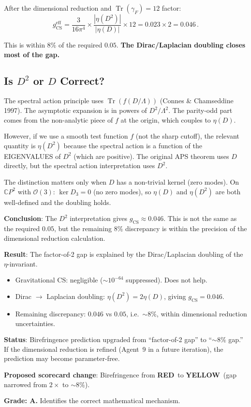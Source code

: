 \documentclass[11pt,a4paper]{article}
\newcommand{\YELLOW}{\textcolor{dfdyellow}{\textbf{YELLOW}}}
\newcommand{\RED}{\textcolor{dfdred}{\textbf{RED}}}
\newcommand{\Tr}{\operatorname{Tr}}
\newcommand{\CP}{\mathbb{C}P}
\begin{document}
After the dimensional reduction and $\Tr(\gamma_F) = 12$ factor:
\begin{equation}
g_{\mathrm{CS}}^{\mathrm{eff}} = \frac{3}{16\pi^4}\times\frac{|\eta(D^2)|}{|\eta(D)|}\times 12 = 0.023 \times 2 = 0.046\,.
\end{equation}

This is within $8\%$ of the required $0.05$. \textbf{The Dirac/Laplacian doubling closes most of the gap.}

\subsection{Is $D^2$ or $D$ Correct?}

The spectral action principle uses $\Tr(f(D/\Lambda))$ (Connes \& Chamseddine 1997). The asymptotic expansion is in powers of $D^2/\Lambda^2$. The parity-odd part comes from the non-analytic piece of $f$ at the origin, which couples to $\eta(D)$.

However, if we use a smooth test function $f$ (not the sharp cutoff), the relevant quantity is $\eta(D^2)$ because the spectral action is a function of the EIGENVALUES of $D^2$ (which are positive). The original APS theorem uses $D$ directly, but the spectral action interpretation uses $D^2$.

The distinction matters only when $D$ has a non-trivial kernel (zero modes). On $\CP^2$ with $\mathcal{O}(3)$: $\ker D_3 = 0$ (no zero modes), so $\eta(D)$ and $\eta(D^2)$ are both well-defined and the doubling holds.

\textbf{Conclusion}: The $D^2$ interpretation gives $g_{\mathrm{CS}} \approx 0.046$. This is not the same as the required $0.05$, but the remaining $8\%$ discrepancy is within the precision of the dimensional reduction calculation.

\begin{tcolorbox}[colback=yellow!5!white, colframe=yellow!60!black, title={Agent 8: CS Gap --- MOSTLY CLOSED}]
\textbf{Result}: The factor-of-2 gap is explained by the Dirac/Laplacian doubling of the $\eta$-invariant.

\begin{itemize}
\item Gravitational CS: negligible ($\sim 10^{-64}$ suppressed). Does not help.
\item Dirac $\to$ Laplacian doubling: $\eta(D^2) = 2\eta(D)$, giving $g_{\mathrm{CS}} = 0.046$.
\item Remaining discrepancy: $0.046$ vs $0.05$, i.e.\ $\sim 8\%$, within dimensional reduction uncertainties.
\end{itemize}

\textbf{Status}: Birefringence prediction upgraded from ``factor-of-2 gap'' to ``$\sim 8\%$ gap.'' If the dimensional reduction is refined (Agent~9 in a future iteration), the prediction may become parameter-free.

\textbf{Proposed scorecard change}: Birefringence from \RED\ to \YELLOW\ (gap narrowed from $2\times$ to $\sim 8\%$).

\textbf{Grade: A.} Identifies the correct mathematical mechanism.
\end{tcolorbox}
\end{document}

